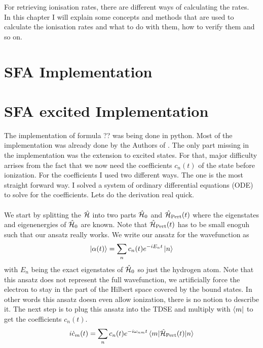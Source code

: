 For retrieving ionisation rates, there are different ways of calculating the rates.\\
In this chapter I will explain some concepts and methods that are used to calculate the ionisation rates and what to do with them, how to verify them and so on.




\section{SFA Implementation}






\section{SFA excited Implementation}
The implementation of formula ?? was being done in python. Most of the implementation was already done by the Authors of \cite{Theory_NPS}.
The only part missing in the implementation was the extension to excited states. 
For that, major difficulty arrises from the fact that we now need the coefficients $c_n(t)$ of the state before ionization.
For the coefficients I used two different ways. The one is the most straight forward way. 
I solved a system of ordinary differential equations (ODE) to solve for the coefficients.
Lets do the derivation real quick.\\\\
We start by splitting the $\hat{\mathcal{H}}$ into two parts $\hat{\mathcal{H}}_0$ and $\hat{\mathcal{H}}_{\mathrm{Pert}}(t)$ where the eigenstates and eigenenergies of $\hat{\mathcal{H}}_0$ are known. 
Note that $\hat{\mathcal{H}}_{\mathrm{Pert}}(t)$ has to be small enoguh such that our ansatz really works.
We write our ansatz for the wavefunction as
\begin{equation*}
    \ket{\alpha(t)} = \sum_n c_n(t) e^{-i E_n t} \ket{n}
\end{equation*}
with $E_n$ being the exact eigenstates of $\hat{\mathcal{H}}_0$ so just the hydrogen atom. 
Note that this ansatz does not represent the full wavefunction, we artificially force the electron to stay in the part of the Hilbert space covered by the bound states.
In other words this ansatz doesn even allow ionization, there is no notion to describe it.
The next step is to plug this ansatz into the TDSE and multiply with $\bra{m}$ to get the coefficients $c_n(t)$.
\begin{equation*}
    i  \dot{c}_m(t) = \sum_n c_n(t) e^{-i \omega_{nm} t} \braket{m|\hat{\mathcal{H}}_{\mathrm{Pert}}(t)|n}  \label{eq:ode}
\end{equation*}
